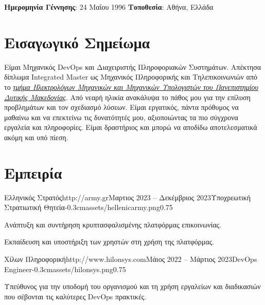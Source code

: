 \documentclass{mycv}
\begin{document}
	\pagestyle{empty}
	\centering
	{\bf Ημερομηνία Γέννησης}: 24 Μαΐου 1996 {\Large\textperiodcentered} {\bf Τοποθεσία}: Αθήνα, Ελλάδα

	\section{Εισαγωγικό Σημείωμα}
	\textnormal Είμαι Μηχανικός DevOps και Διαχειριστής Πληροφοριακών Συστημάτων. Απέκτησα δίπλωμα Integrated Master ως Μηχανικός Πληροφορικής και Τηλεπικοινωνιών από το \href{https://ece.uowm.gr/?lan=gr}{\textit{τμήμα Ηλεκτρολόγων Μηχανικών και Μηχανικών Υπολογιστών του Πανεπιστημίου Δυτικής Μακεδονίας}}. Από νεαρή ηλικία ανακάλυψα το πάθος μου για την επίλυση προβλημάτων και τον σχεδιασμό λύσεων. Είμαι εργατικός, πάντα πρόθυμος να μαθαίνω και να επεκτείνω τις δυνατότητές μου, αξιοποιώντας τα πιο σύγχρονα εργαλεία και πληροφορίες. Είμαι δραστήριος και μπορώ να αποδίδω αποτελεσματικά ακόμη και υπό πίεση.

	\section{Εμπειρία}

	\begin{EntryDatedLogo}{Ελληνικός Στρατός}{http://army.gr}{Μαρτιος 2023 -- Δεκέμβριος 2023}{Υποχρεωτική Στρατιωτική Θητεία}{-0.3cm}{assets/hellenicarmy.png}{0.75}
		\vspace{-0.2cm}
		\begin{Itemize}
   \item Ανάπτυξη και συντήρηση κρυπτασφαλισμένης πλατφόρμας επικοινωνίας.
   \item Εκπαίδευση και υποστήριξη των χρηστών στη χρήση της πλατφόρμας.
		\end{Itemize}
	\end{EntryDatedLogo}

	\vspace{0.75cm}

	\begin{EntryDatedLogo}{Χίλων Πληροφορική}{http://www.hilonsys.com}{Μάιος 2022 -- Μάρτιος 2023}{DevOps Engineer}{-0.3cm}{assets/hilonsys.png}{0.75}
		\vspace{-0.2cm}
		\begin{Itemize}
			\item Υπεύθυνος για την υποδομή του οργανισμού και τη χρήση εργαλείων και διαδικασιών που σέβονται τις καλύτερες DevOps πρακτικές.
		\end{Itemize}
	\end{EntryDatedLogo}
\end{document}
